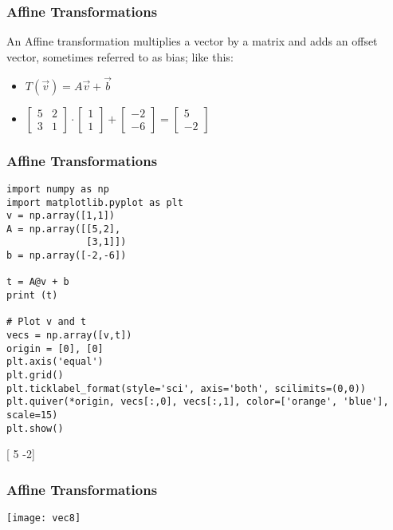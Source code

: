  \begin{frame}[fragile] \frametitle{Affine Transformations}
An Affine transformation multiplies a vector by a matrix and adds an offset vector, sometimes referred to as bias; like this:

\begin{itemize}

\item $T(\vec{v}) = A\vec{v} + \vec{b}$
\item $\begin{bmatrix}5 & 2\\3 & 1\end{bmatrix} \cdot  \begin{bmatrix}1\\1\end{bmatrix} + \begin{bmatrix}-2\\-6\end{bmatrix} = \begin{bmatrix}5\\-2\end{bmatrix}$
\end{itemize}

\end{frame}

 \begin{frame}[fragile] \frametitle{Affine Transformations}
\begin{lstlisting}
import numpy as np
import matplotlib.pyplot as plt
v = np.array([1,1])
A = np.array([[5,2],
              [3,1]])
b = np.array([-2,-6])

t = A@v + b
print (t)

# Plot v and t
vecs = np.array([v,t])
origin = [0], [0]
plt.axis('equal')
plt.grid()
plt.ticklabel_format(style='sci', axis='both', scilimits=(0,0))
plt.quiver(*origin, vecs[:,0], vecs[:,1], color=['orange', 'blue'], scale=15)
plt.show()
\end{lstlisting}
[ 5 -2]
\end{frame}

 \begin{frame}[fragile] \frametitle{Affine Transformations}


\begin{center}
\texttt{[image: vec8]}
\end{center}
 
\end{frame}

